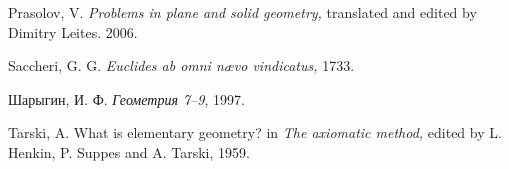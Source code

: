 \begin{thebibliography}{52}
Prasolov, V.
\textit{Problems in plane and solid geometry,} 
translated and edited by Dimitry Leites. 2006.

Saccheri, G. G.
\textit{Euclides ab omni n\ae vo vindicatus,} 
1733.


\begin{otherlanguage}{russian}
Шарыгин, И. Ф.
\textit{Геометрия 7--9}, %
1997.
\end{otherlanguage}

 Tarski, A.
What is elementary geometry? in
\textit{The axiomatic method,} edited by L. Henkin, P. Suppes and A. Tarski,
1959.



\end{thebibliography}


